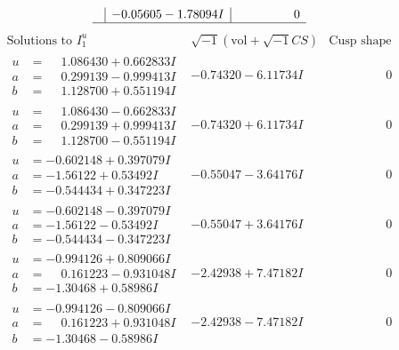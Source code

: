 \documentclass[1p]{elsarticle_modified}
\theoremstyle{definition}
\newcommand{\I}{\sqrt{-1}}
\begin{document}
$$\begin{array}{c|c|c}
 & -0.05605 - 1.78094 I & \phantom{-0.000000 } 0\\
 \hline 
 \end{array}$$\newpage$$\begin{array}{c|c|c}  
\text{Solutions to }I^u_{1}& \I (\text{vol} + \sqrt{-1}CS) & \text{Cusp shape}\\
 \hline 
\begin{aligned}
u &= \phantom{-}1.086430 + 0.662833 I \\
a &= \phantom{-}0.299139 - 0.999413 I \\
b &= \phantom{-}1.128700 + 0.551194 I\end{aligned}
 & -0.74320 - 6.11734 I & \phantom{-0.000000 } 0 \\ \hline\begin{aligned}
u &= \phantom{-}1.086430 - 0.662833 I \\
a &= \phantom{-}0.299139 + 0.999413 I \\
b &= \phantom{-}1.128700 - 0.551194 I\end{aligned}
 & -0.74320 + 6.11734 I & \phantom{-0.000000 } 0 \\ \hline\begin{aligned}
u &= -0.602148 + 0.397079 I \\
a &= -1.56122 + 0.53492 I \\
b &= -0.544434 + 0.347223 I\end{aligned}
 & -0.55047 - 3.64176 I & \phantom{-0.000000 } 0 \\ \hline\begin{aligned}
u &= -0.602148 - 0.397079 I \\
a &= -1.56122 - 0.53492 I \\
b &= -0.544434 - 0.347223 I\end{aligned}
 & -0.55047 + 3.64176 I & \phantom{-0.000000 } 0 \\ \hline\begin{aligned}
u &= -0.994126 + 0.809066 I \\
a &= \phantom{-}0.161223 - 0.931048 I \\
b &= -1.30468 + 0.58986 I\end{aligned}
 & -2.42938 + 7.47182 I & \phantom{-0.000000 } 0 \\ \hline\begin{aligned}
u &= -0.994126 - 0.809066 I \\
a &= \phantom{-}0.161223 + 0.931048 I \\
b &= -1.30468 - 0.58986 I\end{aligned}
 & -2.42938 - 7.47182 I & \phantom{-0.000000 } 0 \\ \hline\begin{aligned}

\end{aligned}
\end{array}$$
\end{document}

